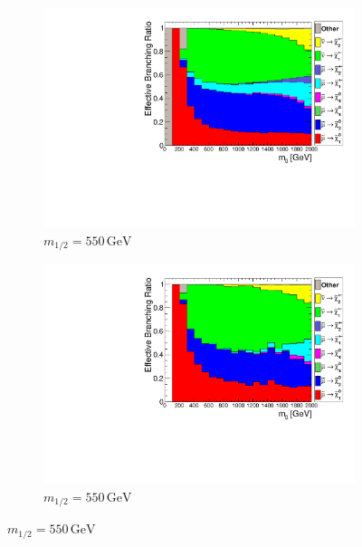 \begin{figure}[ht!]
  \begin{subfigure}[b]{0.495\textwidth}
    \centering
    \includegraphics[width=\textwidth]{plots/hCrossRatio550.pdf}
    \caption{$m_{1/2} = 550\,\text{GeV}$\label{fig:crossratio550}}
  \end{subfigure}
  \begin{subfigure}[b]{0.495\textwidth}
    \centering
    \includegraphics[width=\textwidth]{plots/hCutCrossRatio550.pdf}
    \caption{$m_{1/2} = 550\,\text{GeV}$\label{fig:cutcrossratio550}}
  \end{subfigure}


\end{figure}
